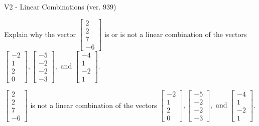 \begin{exercise}
  \begin{exerciseTitle}V2 - Linear Combinations (ver. 939)\end{exerciseTitle}
  \begin{exerciseStatement}
    Explain why the vector \(\left[\begin{array}{c}
2 \\
2 \\
7 \\
-6
\end{array}\right]\)  is or is not a linear 
	combination of the vectors \(\left[\begin{array}{c}
-2 \\
1 \\
2 \\
0
\end{array}\right] , \left[\begin{array}{c}
-5 \\
-2 \\
-2 \\
-3
\end{array}\right] , \text{ and } \left[\begin{array}{c}
-4 \\
1 \\
-2 \\
1
\end{array}\right]\).
	


  \end{exerciseStatement}
  \begin{exerciseAnswer}
   \(\left[\begin{array}{c}
2 \\
2 \\
7 \\
-6
\end{array}\right]\) 
  	 is not  
	a linear combination of the vectors \(\left[\begin{array}{c}
-2 \\
1 \\
2 \\
0
\end{array}\right] , \left[\begin{array}{c}
-5 \\
-2 \\
-2 \\
-3
\end{array}\right] , \text{ and } \left[\begin{array}{c}
-4 \\
1 \\
-2 \\
1
\end{array}\right]\).

	
  


  \end{exerciseAnswer}
\end{exercise}